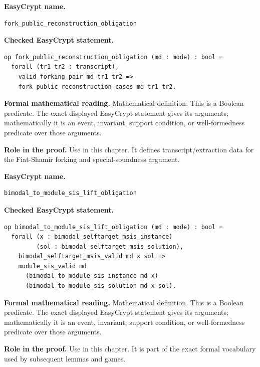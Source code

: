 \begin{formaldefinition}
\noindent\textbf{EasyCrypt name.}
\begin{lstlisting}[language=EasyCrypt,basicstyle=\ttfamily\scriptsize]
fork_public_reconstruction_obligation
\end{lstlisting}
\noindent\textbf{Checked EasyCrypt statement.}
\begin{lstlisting}[language=EasyCrypt,basicstyle=\ttfamily\scriptsize]
op fork_public_reconstruction_obligation (md : mode) : bool =
  forall (tr1 tr2 : transcript),
    valid_forking_pair md tr1 tr2 =>
    fork_public_reconstruction_cases md tr1 tr2.
\end{lstlisting}
\noindent\textbf{Formal mathematical reading.}
Mathematical definition. This is a Boolean predicate.  The exact displayed EasyCrypt statement gives its arguments; mathematically it is an event, invariant, support condition, or well-formedness predicate over those arguments.

\noindent\textbf{Role in the proof.}
Use in this chapter. It defines transcript/extraction data for the Fiat-Shamir forking and special-soundness argument.

\end{formaldefinition}

\begin{formaldefinition}
\noindent\textbf{EasyCrypt name.}
\begin{lstlisting}[language=EasyCrypt,basicstyle=\ttfamily\scriptsize]
bimodal_to_module_sis_lift_obligation
\end{lstlisting}
\noindent\textbf{Checked EasyCrypt statement.}
\begin{lstlisting}[language=EasyCrypt,basicstyle=\ttfamily\scriptsize]
op bimodal_to_module_sis_lift_obligation (md : mode) : bool =
  forall (x : bimodal_selftarget_msis_instance)
         (sol : bimodal_selftarget_msis_solution),
    bimodal_selftarget_msis_valid md x sol =>
    module_sis_valid md
      (bimodal_to_module_sis_instance md x)
      (bimodal_to_module_sis_solution md x sol).
\end{lstlisting}
\noindent\textbf{Formal mathematical reading.}
Mathematical definition. This is a Boolean predicate.  The exact displayed EasyCrypt statement gives its arguments; mathematically it is an event, invariant, support condition, or well-formedness predicate over those arguments.

\noindent\textbf{Role in the proof.}
Use in this chapter. It is part of the exact formal vocabulary used by subsequent lemmas and games.

\end{formaldefinition}

